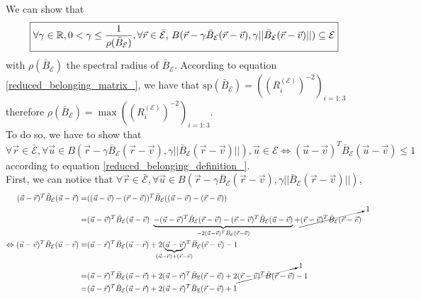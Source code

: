 \documentclass[class=report, float=false, crop=false]{standalone}
\begin{document}
We can show that
\begin{equation}
\boxed{\forall \gamma \in \mathbb{R}, 0 < \gamma \leq \frac{1}{\rho(\bar{B}_{\mathcal{E}})}, \forall \vec{r} \in \bar{\mathcal{E}}$, $B(\vec{r} - \gamma \bar{B}_{\mathcal{E}}(\vec{r} - \vec{v}),\gamma ||\bar{B}_{\mathcal{E}}(\vec{r} - \vec{v})||) \subseteq \mathcal{E}}
\end{equation}
with $\rho(\bar{B}_{\mathcal{E}})$ the spectral radius \cite{wiki:spectral} of $\bar{B}_{\mathcal{E}}$. According to equation \ref{reduced_belonging_matrix_}, we have that $\text{sp}(\bar{B}_{\mathcal{E}}) = ((R_i^{(\mathcal{E})})^{-2})_{i=1:3}$ therefore $\boxed{\rho(\bar{B}_{\mathcal{E}}) = \max((R_i^{(\mathcal{E})})^{-2})_{i=1:3}}$.\\

To do so, we have to show that $\forall \vec{r} \in \bar{\mathcal{E}}, \forall \vec{u} \in B(\vec{r} - \gamma \bar{B}_{\mathcal{E}}(\vec{r} - \vec{v}),\gamma ||\bar{B}_{\mathcal{E}}(\vec{r} - \vec{v})||), \vec{u} \in \mathcal{E} \Leftrightarrow (\vec{u} - \vec{v})^T\bar{B}_{\mathcal{E}}(\vec{u} - \vec{v}) \leq 1$ according to equation \ref{reduced_belonging_definition_}.\\

First, we can notice that $\forall \vec{r} \in \bar{\mathcal{E}}, \forall \vec{u} \in B(\vec{r} - \gamma \bar{B}_{\mathcal{E}}(\vec{r} - \vec{v}),\gamma ||\bar{B}_{\mathcal{E}}(\vec{r} - \vec{v})||)$,
\begin{align*}
(\vec{u} - \vec{r})^T\bar{B}_{\mathcal{E}}(\vec{u} - \vec{r}) =& ((\vec{u} - \vec{v}) - (\vec{r} - \vec{v}))^T\bar{B}_{\mathcal{E}}((\vec{u} - \vec{v}) - (\vec{r} - \vec{v}))\\
=& (\vec{u} - \vec{v})^T\bar{B}_{\mathcal{E}}(\vec{u} - \vec{v}) ~\underbrace{- (\vec{u} - \vec{v})^T\bar{B}_{\mathcal{E}}(\vec{r} - \vec{v}) - (\vec{r} - \vec{v})^T\bar{B}_{\mathcal{E}}(\vec{u} - \vec{v})}_{-2(\vec{u} - \vec{v})^T\bar{B}_{\mathcal{E}}(\vec{r} - \vec{v})} + \cancelto{1}{(\vec{r} - \vec{v})^T\bar{B}_{\mathcal{E}}(\vec{r} - \vec{v})}\\
\Leftrightarrow (\vec{u} - \vec{v})^T\bar{B}_{\mathcal{E}}(\vec{u} - \vec{v}) =& (\vec{u} - \vec{r})^T\bar{B}_{\mathcal{E}}(\vec{u} - \vec{r}) + 2(\underbrace{\vec{u} - \vec{v}}_{\mathclap{(\vec{u} - \vec{r}) + (\vec{r} - \vec{v})}})^T\bar{B}_{\mathcal{E}}(\vec{r} - \vec{v}) - 1\\
=& (\vec{u} - \vec{r})^T\bar{B}_{\mathcal{E}}(\vec{u} - \vec{r}) + 2(\vec{u} - \vec{r})^T\bar{B}_{\mathbb{E}}(\vec{r} - \vec{v}) + 2\cancelto{1}{(\vec{r} - \vec{v})^T\bar{B}(\vec{r} - \vec{v})} - 1\\
=& (\vec{u} - \vec{r})^T\bar{B}_{\mathcal{E}}(\vec{u} - \vec{r}) + 2(\vec{u} - \vec{r})^T\bar{B}_{\mathbb{E}}(\vec{r} - \vec{v}) + 1
\end{align*}
\end{document}

